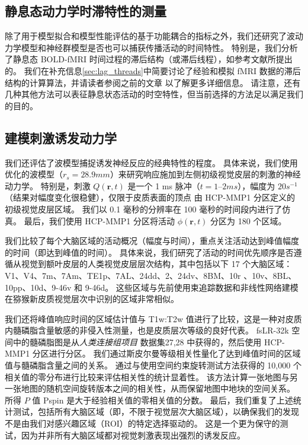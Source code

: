 \documentclass[lang=cn,a4paper,newtx]{elegantpaper}
\begin{document}
\subsection{静息态动力学时滞特性的测量} \label{sec:dynamics_measurement}

除了用于模型拟合和模型性能评估的基于功能耦合的指标之外，我们还研究了波动力学模型和神经群模型是否也可以捕获传播活动的时间特性。
特别是，我们分析了静息态 BOLD-fMRI 时间过程的滞后结构（或滞后线程），如参考文献\cite{mitra2015lag,mitra2014lag}所提出的。
我们在补充信息\ref{sec:lag_threads}中简要讨论了经验和模拟 fMRI 数据的滞后结构的计算算法，并请读者参阅之前的文章\cite{mitra2015lag,mitra2014lag} 以了解更多详细信息。
请注意，还有几种其他方法可以表征静息状态活动的时空特性\cite{bolt2022parsimonious,cabral2017functional,kashyap2019dynamic}，但当前选择的方法足以满足我们的目的。


\subsection{建模刺激诱发动力学} \label{sec:modelling_stimulus}

我们还评估了波模型捕捉诱发神经反应的经典特性的程度。
具体来说，我们使用优化的波模型（$ r_s = 28.9 mm $）来研究响应施加到左侧初级视觉皮层的刺激的神经动力学。
特别是，刺激 $ Q(\boldsymbol{r},t) $ 是一个 1 ms 脉冲（$ t = 1–2 ms $），幅度为 $ 20 s^{-1} $（结果对幅度变化很稳健），仅限于皮质表面的顶点 由 HCP-MMP1 分区定义的 初级视觉皮层区域。
我们以 0.1 毫秒的分辨率在 100 毫秒的时间段内进行了仿真。 
最后，我们使用 HCP-MMP1 分区将活动 $ \phi(\boldsymbol{r},t) $ 分区为 180 个区域。


我们比较了每个大脑区域的活动概况（幅度与时间），重点关注活动达到峰值幅度的时间（即达到峰值的时间）。
具体来说，我们研究了活动的时间优先顺序是否遵循从视觉到额叶皮层的人类视觉皮层层次结构，其中包括以下 17 个大脑区域：V1、V4、7m、7Am、TE1p、7AL、24dd、2、24dv、8BM、10r 、10v、8BL、10pp、10d、9-46v 和 9-46d。
这些区域与先前使用束追踪数据和非线性网络建模在猕猴新皮质视觉层次中识别的区域非常相似\cite{chaudhuri2015large}。


我们还将峰值响应时间的区域估计值与 T1w:T2w 值进行了比较，这是一种对皮质内髓磷脂含量敏感的非侵入性测量\cite{glasser2011mapping}，也是皮质层次等级\cite{burt2018hierarchy}的良好代表。
fsLR-32k 空间中的髓磷脂图是从\textit{人类连接组项目} 数据集27,28 中获得的，然后使用 HCP-MMP1 分区进行分区。
我们通过斯皮尔曼等级相关性量化了达到峰值时间的区域值与髓磷脂含量之间的关系。
通过与使用空间约束旋转测试方法获得的 10,000 个相关值的零分布进行比较来评估相关性的统计显着性\cite{vavsa2018adolescent,alexander2018testing}。
该方法计算一张地图与另一张地图的随机空间旋转版本之间的相关性，从而保留地图中地块的空间关系。
所得 $ P $ 值 Pspin 是大于经验相关值的零相关值的分数。
最后，我们重复了上述统计测试，包括所有大脑区域（即，不限于视觉层次大脑区域），以确保我们的发现不是由我们对感兴趣区域（ROI）的特定选择驱动的。
这是一个更为保守的测试，因为并非所有大脑区域都对视觉刺激表现出强烈的诱发反应。
\end{document}
